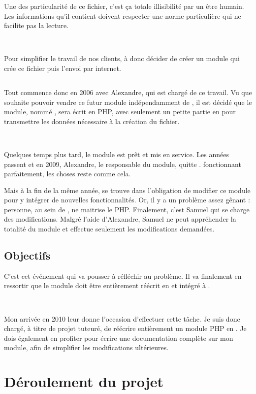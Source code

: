 Une des particularité de ce fichier, c'est ça totale illisibilité par un être humain. Les informations qu'il contient doivent respecter une norme particulière qui ne facilite pas la lecture.

~

Pour simplifier le travail de nos clients, \solulog{} à donc décider de créer un module qui crée ce fichier puis l'envoi par internet.

\subsection{\pireus}
Tout commence donc en 2006 avec Alexandre, qui est chargé de ce travail. Vu que \solulog{} souhaite pouvoir vendre ce futur module indépendamment de \integrale, il est décidé que le module, nommé \emph{\pireus}, sera écrit en PHP, avec seulement un petite partie en \vb{} pour transmettre les données nécessaire à la création du fichier.

~

Quelques temps plus tard, le module est prêt et mis en service. Les années passent et en 2009, Alexandre, le responsable du module, quitte \solulog. \pireus fonctionnant parfaitement, les choses reste comme cela.

Mais à la fin de la même année, \solulog{} se trouve dans l'obligation de modifier ce module pour y intégrer de nouvelles fonctionnalités. Or, il y a un problème assez gênant : personne, au sein de \solulog, ne maitrise le PHP. Finalement, c'est Samuel qui se charge des modifications. Malgré l'aide d'Alexandre, Samuel ne peut appréhender la totalité du module et effectue seulement les modifications demandées.

\vfill

\subsection{Objectifs}
C'est cet événement qui va pousser \solulog{} à réfléchir au problème. Il va finalement en ressortir que le module doit être entièrement réécrit en \vb{} et intégré à \integrale.

~

Mon arrivée en 2010 leur donne l'occasion d'effectuer cette tâche. Je suis donc chargé, à titre de projet tuteuré, de réécrire entièrement un module PHP en \vb. Je dois également en profiter pour écrire une documentation complète sur mon module, afin de simplifier les modifications ultérieures.

\section{Déroulement du projet}
